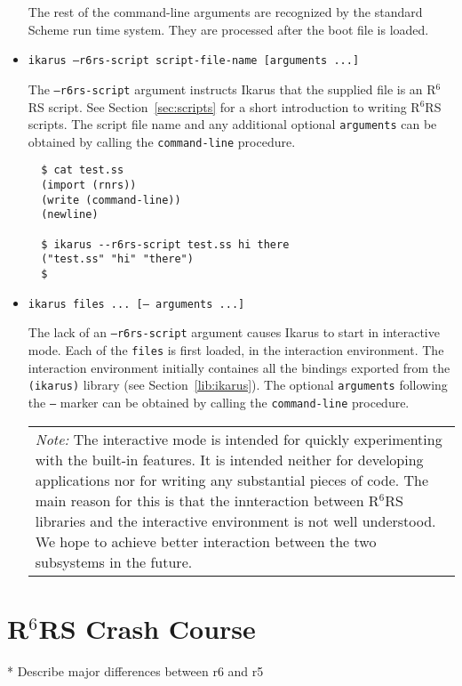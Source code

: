 \documentclass[onecolumn, 12pt, twoside, openright, dvipdfm]{book}
\newcommand{\rnrs}[1]{R$^{\mathrm{#1}}$RS}
\newcommand{\BoxedText}[2]{
  \vspace{.05in}
  \begin{center}
    \begin{tabular}{|p{4.6in}|} {\large \emph{#1}} #2 \end{tabular}
  \end{center}
  \vspace{.05in}
}
\begin{document}
\begin{itemize}
The rest of the command-line arguments are recognized by the
standard Scheme run time system.   They are processed after the
boot file is loaded.

\item \texttt{ikarus --r6rs-script script-file-name [arguments ...]}

\index{\rnrs{6} Script} The \texttt{--r6rs-script} argument
instructs Ikarus that the supplied file is an \rnrs{6} script.  See
Section~\ref{sec:scripts} for a short introduction to writing \rnrs{6}
scripts.  The script file name and any additional optional
\texttt{arguments}
can be obtained by calling the
\texttt{command-line} procedure.

\begin{verbatim}
  $ cat test.ss 
  (import (rnrs))
  (write (command-line))
  (newline)

  $ ikarus --r6rs-script test.ss hi there
  ("test.ss" "hi" "there")
  $
\end{verbatim}

\item \texttt{ikarus files ... [-- arguments ...]}

The lack of an \texttt{--r6rs-script} argument causes Ikarus to
start in interactive mode.  Each of the \texttt{files} is first
loaded, in the interaction environment.  The interaction environment
initially containes all the bindings exported from the
\texttt{(ikarus)} library (see Section~\ref{lib:ikarus}).  The
optional \texttt{arguments} following the \texttt{--} marker can be obtained
by calling the \texttt{command-line} procedure.


\BoxedText{Note:}{The interactive mode is intended for quickly
experimenting with the built-in features.  It is intended neither
for developing applications nor for writing any substantial pieces
of code.  The main reason for this is that the innteraction between
\rnrs{6} libraries and the interactive environment is not well
understood.  We hope to achieve better interaction between the two
subsystems in the future.}

\end{itemize}



\newpage


\chapter{\rnrs{6} Crash Course}

* Describe major differences between r6 and r5
\end{document}
